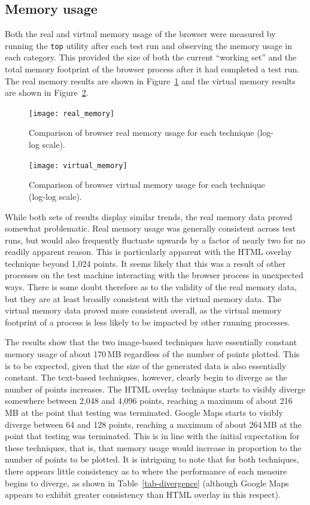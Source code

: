 \documentclass[acmnow]{acmtrans2m}
\begin{document}
\subsection{Memory usage}

Both the real and virtual memory usage of the browser were measured by
running the \texttt{top} utility after each test run and observing the
memory usage in each category. This provided the size of both the
current ``working set'' and the total memory footprint of the browser
process after it had completed a test run. The real memory results are
shown in Figure~\ref{fig-real-memory} and the virtual memory results are
shown in Figure~\ref{fig-virtual-memory}.


\begin{figure}
	\centering
	\texttt{[image: real\_memory]}
	\caption{Comparison of browser real memory usage for each technique
	(log-log scale).}
	\label{fig-real-memory}
\end{figure}


\begin{figure}
	\centering
	\texttt{[image: virtual\_memory]}
	\caption{Comparison of browser virtual memory usage for each
	technique (log-log scale).}
	\label{fig-virtual-memory}
\end{figure}


While both sets of results display similar trends, the real memory data
proved somewhat problematic. Real memory usage was generally consistent
across test runs, but would also frequently fluctuate upwards by a
factor of nearly two for no readily apparent reason. This is
particularly apparent with the HTML overlay technique beyond 1,024
points. It seems likely that this was a result of other processes on the
test machine interacting with the browser process in unexpected ways.
There is some doubt therefore as to the validity of the real memory
data, but they are at least broadly consistent with the virtual memory
data. The virtual memory data proved more consistent overall, as the
virtual memory footprint of a process is less likely to be impacted by
other running processes.

The results show that the two image-based techniques have essentially
constant memory usage of about 170\,MB regardless of the number of
points plotted. This is to be expected, given that the size of the
generated data is also essentially constant. The text-based techniques,
however, clearly begin to diverge as the number of points increases. The
HTML overlay technique starts to visibly diverge somewhere between 2,048
and 4,096 points, reaching a maximum of about 216\,MB at the point that
testing was terminated. Google Maps starts to visibly diverge between 64
and 128 points, reaching a maximum of about 264\,MB at the point that
testing was terminated. This is in line with the initial expectation for
these techniques, that is, that memory usage would increase in
proportion to the number of points to be plotted. It is intriguing to
note that for both techniques, there appears little consistency as to
where the performance of each measure begins to diverge, as shown in
Table~\ref{tab-divergence} (although Google Maps appears to exhibit
greater consistency than HTML overlay in this respect).
\end{document}

